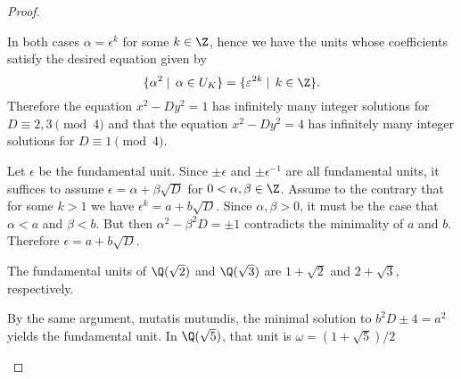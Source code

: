 \documentclass[10pt]{amsart}
\begin{document}
\begin{thm}
\begin{proof}
\begin{alphaenum}
      In both cases $\alpha = \epsilon^k$ for some $k \in \Z$, hence we have the units whose coefficients satisfy the desired equation given by
      $$\{\alpha^2 \mid\, \alpha \in U_K\} = \{\epsilon^{2k} \mid\, k \in \Z\}.$$
      Therefore the equation $x^2 - Dy^2 = 1$ has infinitely many integer solutions for $D \equiv 2,3 \pmod{4}$ and that the equation $x^2 - Dy^2 = 4$ has infinitely many integer solutions for $D \equiv 1 \pmod{4}$.
    \item
      Let $\epsilon$ be the fundamental unit.
      Since $\pm\epsilon$ and $\pm\epsilon^{-1}$ are all fundamental units, it suffices to assume $\epsilon = \alpha + \beta\sqrt{D}$ for $0< \alpha,\beta \in \Z$.
      Assume to the contrary that for some $k > 1$ we have $\epsilon^k = a + b\sqrt{D}$.
      Since $\alpha,\beta > 0$, it must be the case that $\alpha < a$ and $\beta < b$.
      But then $\alpha^2 - \beta^2D = \pm 1$ contradicts the minimality of $a$ and $b$.
      Therefore $\epsilon = a + b\sqrt{D}$.
      
      The fundamental units of $\Q(\sqrt{2})$ and $\Q(\sqrt{3})$ are $1 + \sqrt{2}$ and $2 + \sqrt{3}$, respectively.
    \item
      By the same argument, mutatis mutundis, the minimal solution to $b^2D \pm 4 = a^2$ yields the fundamental unit.
      In $\Q(\sqrt{5})$, that unit is $\omega = (1 + \sqrt{5})/2$
    \end{alphaenum}
  \end{proof}
\end{thm}
\end{document}
